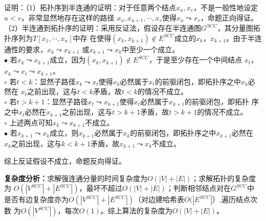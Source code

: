 \begin{solution}
    证明：（1）拓扑序到半连通的证明：对于任意两个结点$x_u,x_v$，不是一般性地设定$u<v$，非常显然地存在这样的路径
    $x_u,x_{u+1},\cdots,x_v$使得$x_u\leadsto x_v$，命题正向得证。\\
    （2）半连通到拓扑序的证明：采用反证法，假设存在半连通图$G^{SCC}$，其分量图拓扑序列为$T[x_1,\cdots,x_n]$中存
    在使得$(x_k,x_{k+1}) \notin E^{SCC}$成立的$x_k$，$x_{k+1}$。由于半连通性的要求，$x_k \leadsto x_{k+1}$
    或$x_{k+1} \leadsto x_{k}$中至少一个成立。\\
    $\bullet$ 若$x_k \leadsto x_{k+1}$成立，因为$(x_k,x_{k+1}) \notin E^{SCC}$，于是至少存在一个中间结点
    $x_t$，$x_k \leadsto x_t \leadsto x_{k+1}$。\\
    \qquad $\circ$ 若$t<k$：显然子路径$x_k \leadsto x_t$使得$x_k$必然属于$x_t$的前驱闭包，即拓扑序之中$x_k$必然在
    $x_t$之前出现，这与$t<k$矛盾，故$t<k$的情况不成立。\\
    \qquad $\circ$ 若$t>k+1$：显然子路径$x_{t} \leadsto x_{k+1}$使得$x_t$必然属于$x_{k+1}$的前驱闭包，即拓扑
    序之中$x_t$必然在$x_{k+1}$之前出现，这与$t>k+1$矛盾，故$t>k+1$的情况不成立。\\
    \qquad $\circ$ 上述两点可知$x_k \leadsto x_{k+1}$不成立。\\
    $\bullet$ 若$x_{k+1} \leadsto x_k$成立，则$x_{k+1}$必然属于$x_{k}$的前驱闭包，即拓扑序之中$x_{k+1}$必然在
    $x_{k}$之前出现，这与$k<k+1$矛盾，故$x_{k+1} \leadsto x_k$不成立。

    综上反证假设不成立，命题反向得证。

    \textbf{复杂度分析：}求解强连通分量的时间复杂度为$O(|V|+|E|)$；求解拓扑的复杂度为
    $O(|V^{SCC}|+|E^{SCC}|)$，最坏不超过$O(|V|+|E|)$；判断相邻结点对在$G^{SCC}$中
    是否有边复杂度亦为$O(|V^{SCC}|+|E^{SCC}|)$（对边建哈希表$O(|E^{SCC}|）$,遍历结点次数
    为$O(|V^{SCC}|)$，每次$O(1)$。综上算法的复杂度为$O(|V|+|E|)$。
\end{solution} 